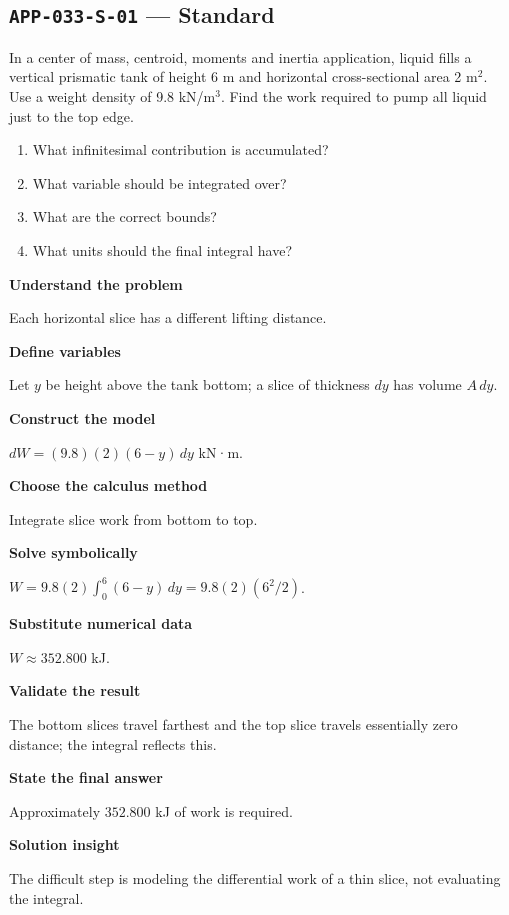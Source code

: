 \documentclass[11pt]{book}
\newcommand{\pid}[1]{\texttt{#1}}
\begin{document}
\subsection*{\pid{APP-033-S-01} — Standard}
\begin{problembox}
In a center of mass, centroid, moments and inertia application, liquid fills a vertical prismatic tank of height 6 m and horizontal cross-sectional area 2 m$^2$. Use a weight density of 9.8 kN/m$^3$. Find the work required to pump all liquid just to the top edge.
\end{problembox}
\begin{promptbox}\begin{enumerate}
\item What infinitesimal contribution is accumulated?
\item What variable should be integrated over?
\item What are the correct bounds?
\item What units should the final integral have?
\end{enumerate}\end{promptbox}
\begin{solutionbox}
\textbf{Understand the problem}\par Each horizontal slice has a different lifting distance.\par\medskip
\textbf{Define variables}\par Let $y$ be height above the tank bottom; a slice of thickness $dy$ has volume $A\,dy$.\par\medskip
\textbf{Construct the model}\par $dW=(9.8)(2)(6-y)\,dy$ kN·m.\par\medskip
\textbf{Choose the calculus method}\par Integrate slice work from bottom to top.\par\medskip
\textbf{Solve symbolically}\par $W=9.8(2)\int_0^{6}(6-y)\,dy=9.8(2)(6^2/2)$.\par\medskip
\textbf{Substitute numerical data}\par $W\approx 352.800$ kJ.\par\medskip
\textbf{Validate the result}\par The bottom slices travel farthest and the top slice travels essentially zero distance; the integral reflects this.\par\medskip
\textbf{State the final answer}\par Approximately $352.800$ kJ of work is required.\par\medskip
\textbf{Solution insight}\par The difficult step is modeling the differential work of a thin slice, not evaluating the integral.\par\medskip
\end{solutionbox}
\end{document}
